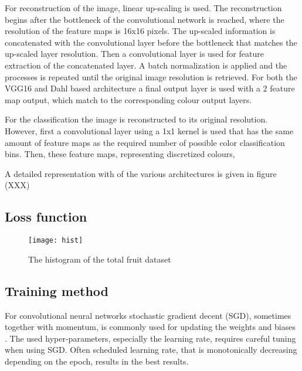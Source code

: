 {For reconstruction of the image, linear up-scaling is used. The reconstruction begins after the bottleneck of the convolutional network is reached, where the resolution of the feature maps is 16x16 pixels. The up-scaled information is concatenated with the convolutional layer before the bottleneck that matches the up-scaled layer resolution. Then a convolutional layer is used for feature extraction of the concatenated layer. A batch normalization is applied and the processes is repeated until the original image resolution is retrieved. For both the VGG16 and Dahl based architecture a final output layer is used with a 2 feature map output, which match to the corresponding colour output layers.

For the classification the image is reconstructed to its original resolution. However, first a convolutional layer using a 1x1 kernel is used that has the same amount of feature maps as the required number of possible color classification bins. Then, these feature maps, representing discretized colours, %


A detailed representation with of the various architectures is given in figure {\color{red}(XXX)}}

\subsection{Loss function}

\begin{wrapfigure}{R}{0.5\textwidth}
	\vspace{-20pt}
	\begin{center}
		\texttt{[image: hist]}
	\end{center}
	\caption{\color{red} The histogram of the total fruit dataset}
	\vspace{-10pt}
\end{wrapfigure}

\subsection{Training method}
For convolutional neural networks stochastic gradient decent {\color{red}(SGD)}, sometimes together with momentum, is commonly used for updating the weights and biases \cite{IizukaSIGGRAPH2016} \cite{Simonyan}. The used hyper-parameters, especially the learning rate, requires careful tuning when using SGD. Often scheduled learning rate, that is monotonically decreasing depending on the epoch, results in the best results. 



